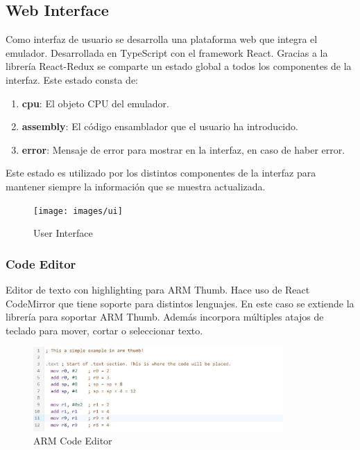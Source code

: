     \newpage
    \subsection{Web Interface}
    {
        Como interfaz de usuario se desarrolla una plataforma web que integra el emulador. Desarrollada en TypeScript con el framework React. Gracias a la librería React-Redux se comparte un estado global a todos los componentes de la interfaz. Este estado consta de:
        \begin{enumerate}
            \item \textbf{cpu}: El objeto CPU del emulador.
            \item \textbf{assembly}: El código ensamblador que el usuario ha introducido.
            \item \textbf{error}: Mensaje de error para mostrar en la interfaz, en caso de haber error.
        \end{enumerate}

        Este estado es utilizado por los distintos componentes de la interfaz para mantener siempre la información que se muestra actualizada.
        
        \begin{figure}[h]
         \centering
            \texttt{[image: images/ui]}
            \caption{User Interface}
        \end{figure}
        
        \subsubsection{Code Editor}
        {
            Editor de texto con highlighting para ARM Thumb. Hace uso de React CodeMirror que tiene soporte para distintos lenguajes. En este caso se extiende la librería para soportar ARM Thumb. Además incorpora múltiples atajos de teclado para mover, cortar o seleccionar texto.
            
            \begin{figure}[h]
                \centering
                \includegraphics[width=0.85\textwidth]{images/editor}
                \caption{ARM Code Editor}
            \end{figure}

}}

